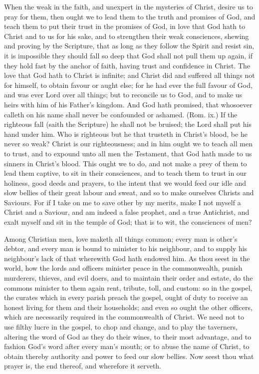 When the weak in the faith, and unexpert in the mysteries
of Christ, desire us to pray for them, then ought we 
to lead them to the truth and promises of God, and teach 
them to put their trust in the promises of God, in love 
that God hath to Christ and to us for his sake, and to 
strengthen their weak consciences, shewing and proving by 
the Scripture, that as long as they follow the Spirit and 
resist sin, it is impossible they should fall so deep that 
God shall not pull them up again, if they hold fast by the 
anchor of faith, having trust and confidence in Christ. 
The love that God hath to Christ is infinite; and Christ 
did and suffered all things not for himself, to obtain favour 
or aught else; for he had ever the full favour of God, and 
was ever Lord over all things; but to reconcile us to God, 
and to make us heirs with him of his Father's kingdom. 
And God hath promised, that whosoever calleth on his 
name shall never be confounded or ashamed. (Rom. ix.) 
If the righteous fall (saith the Scripture) he shall not be 
bruised; the Lord shall put his hand under him. Who is 
righteous but he that trusteth in Christ's blood, be he 
never so weak? Christ is our righteousness; and in him 
ought we to teach all men to trust, and to expound unto 
all men the Testament, that God hath made to us sinners 
in Christ's blood. This ought we to do, and not make a 
prey of them to lead them captive, to sit in their consciences, 
and to teach them to trust in our holiness, good deeds and 
prayers, to the intent that we would feed our idle and slow 
bellies of their great labour and sweat, and so to make 
ourselves Christs and Saviours. For if I take on me to 
save other by my merits, make I not myself a Christ 
and a Saviour, and am indeed a false prophet, and a true 
Antichrist, and exalt myself and sit in the temple of God; 
that is to wit, the consciences of men? 

Among Christian men, love maketh all things common; 
every man is other's debtor, and every man is bound 
to minister to his neighbour, and to supply his neighbour's
lack of that wherewith God hath endowed 
him. As thou seest in the world, how the lords and 
officers minister peace in the commonwealth, punish 
murderers, thieves, and evil doers, and to maintain their 
order and estate, do the commons minister to them again 
rent, tribute, toll, and custom: so in the gospel, the curates 
which in every parish preach the gospel, ought of duty to 
receive an honest living for them and their households; and 
even so ought the other officers, which are necessarily required
in the commonwealth of Christ. We need not to 
use filthy lucre in the gospel, to chop and change, and to 
play the taverners, altering the word of God as they do 
their wines, to their most advantage, and to fashion God's 
word after every man's mouth; or to abuse the name of 
Christ, to obtain thereby authority and power to feed our 
slow bellies. Now seest thou what prayer is, the end 
thereof, and wherefore it serveth. 

